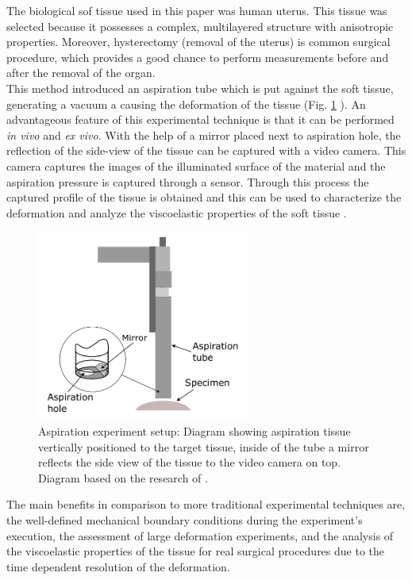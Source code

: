 The biological sof tissue used in this paper was human uterus. This tissue was selected 
because it possesses a complex, multilayered structure with anisotropic properties. 
Moreover, hysterectomy (removal of the uterus) is common surgical procedure, which 
provides a good chance to perform measurements before and after the removal of the organ.\\

This method introduced an aspiration tube which is put against the 
soft tissue, generating a vacuum a causing the deformation of the tissue (Fig. \ref{fig:aspiration} ). 
An advantageous feature of this experimental technique is that 
it can be performed \textit{in vivo} and \textit{ex vivo}.
With the help of a mirror placed next to aspiration hole, the reflection 
of the side-view of the tissue can be captured with a video camera.
This camera captures the images of the illuminated surface of the material and the 
aspiration pressure is captured through a sensor. Through this process the captured 
profile of the tissue is obtained and this can be used to characterize the deformation 
and analyze the viscoelastic properties of the soft tissue \cite{Kauer2002}.

\begin{figure}[th]
        \centering
        \includegraphics[width=7cm]{Images/chapter1/aspirationkauer.png}
        \caption[Aspiration experiment]{Aspiration experiment setup: Diagram showing aspiration tissue vertically positioned to the target tissue, inside of the tube a mirror reflects the side view of the tissue to the video camera on top. Diagram based on the research of \citet{Kauer2002}.}
        \label{fig:aspiration}
\end{figure}

The main benefits in comparison to more traditional experimental techniques are, 
the well-defined mechanical boundary conditions during the experiment's execution, the assessment of 
large deformation experiments, and the analysis of the viscoelastic
properties of the tissue for real surgical procedures due to 
the time dependent resolution of the deformation.

